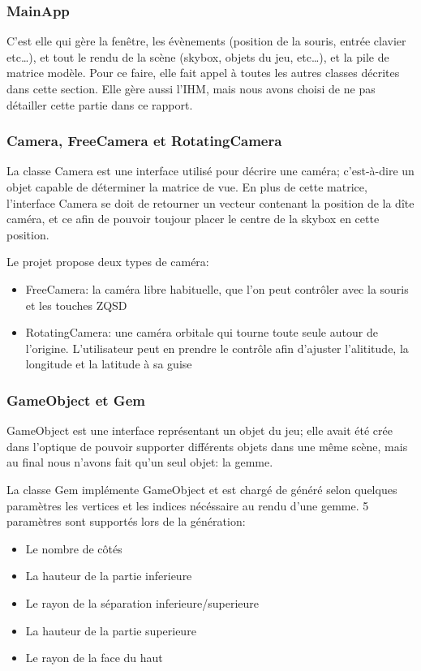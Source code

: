 \documentclass[a4paper,12pt]{article}
\begin{document}
\subsubsection{MainApp}
C'est elle qui gère la fenêtre, les évènements (position de la souris, entrée clavier etc\ldots), et tout le
rendu de la scène (skybox, objets du jeu, etc\ldots), et la pile de matrice modèle.
Pour ce faire, elle fait appel à toutes les autres classes décrites dans cette section. Elle gère aussi l'IHM,
mais nous avons choisi de ne pas détailler cette partie dans ce rapport.

\subsubsection{Camera, FreeCamera et RotatingCamera}
La classe Camera est une interface utilisé pour décrire une caméra; c'est-à-dire un objet capable de déterminer
la matrice de vue. En plus de cette matrice, l'interface Camera se doit de retourner un vecteur contenant la
position de la dîte caméra, et ce afin de pouvoir toujour placer le centre de la skybox en cette position.

Le projet propose deux types de caméra:
\begin{itemize}
    \item FreeCamera: la caméra libre habituelle, que l'on peut contrôler avec la souris et les touches ZQSD
    \item RotatingCamera: une caméra orbitale qui tourne toute seule autour de l'origine. L'utilisateur peut en prendre le contrôle afin d'ajuster l'alititude, la longitude et la latitude à sa guise
\end{itemize}

\subsubsection{GameObject et Gem}
GameObject est une interface représentant un objet du jeu; elle avait été crée dans l'optique de pouvoir supporter
différents objets dans une même scène, mais au final nous n'avons fait qu'un seul objet: la gemme.

La classe Gem implémente GameObject et est chargé de généré selon quelques paramètres les vertices et les indices
nécéssaire au rendu d'une gemme. 5 paramètres sont supportés lors de la génération:
\begin{itemize}
    \item Le nombre de côtés
    \item La hauteur de la partie inferieure
    \item Le rayon de la séparation inferieure/superieure
    \item La hauteur de la partie superieure
    \item Le rayon de la face du haut
\end{itemize}
\end{document}
